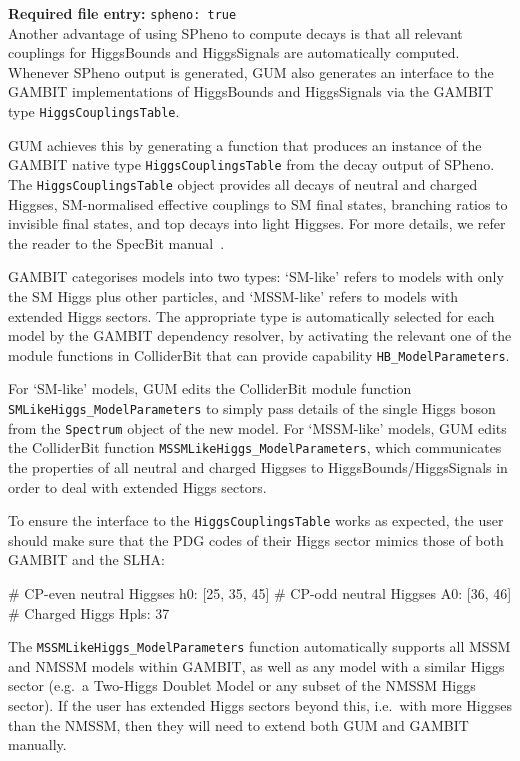 \documentclass[pdftex,twocolumn,epjc3_preprint,runningheads]{svjour3}
\renewcommand{\_}{\discretionary{\underscore}{}{\underscore}}
\newcommand\cpp[1]{{\lstinline!#1!}}  %
\newcommand\term[1]{{\lstset{style=terminal}\lstinline!#1!\lstset{style=cpp}}}
\newcommand\guminline[1]{{{\lstset{style=gum}\lstinline!#1!}}}
\newcommand{\eg}{e.g.\ }
\newcommand{\gambit}{\textsf{GAMBIT}\xspace}
\newcommand{\colliderbit}{\textsf{ColliderBit}\xspace}
\newcommand{\specbit}{\textsf{SpecBit}\xspace}
\newcommand{\GB}{\gambit}
\newcommand{\higgsbounds}{\textsf{HiggsBounds}\xspace}
\newcommand{\higgssignals}{\textsf{HiggsSignals}\xspace}
\newcommand{\gum}{\textsf{GUM}\xspace}
\newcommand{\dgum}{\!\!\term{.gum}\!\xspace}
\newcommand{\spheno}{\textsf{SPheno}\xspace}
\begin{document}
\textbf{Required \dgum file entry:} \guminline{spheno: true}\\

Another advantage of using \spheno to compute decays is that all relevant couplings for \higgsbounds and \higgssignals are automatically computed. Whenever \spheno output is generated, \gum also generates an interface to the \GB implementations of \higgsbounds and \higgssignals via the \GB type \cpp{HiggsCouplingsTable}.

\gum achieves this by generating a function that produces an instance of the \GB native type \cpp{HiggsCouplingsTable} from the decay output of \spheno. The \cpp{HiggsCouplingsTable} object provides all decays of neutral and charged Higgses, SM-normalised effective couplings to SM final states, branching ratios to invisible final states, and top decays into light Higgses. For more details, we refer the reader to the \specbit manual~\cite{SDPBit}.

\GB categorises models into two types: `SM-like' refers to models with only the SM Higgs plus other particles, and `MSSM-like' refers to models with extended Higgs sectors. The appropriate type is automatically selected for each model by the \GB dependency resolver, by activating the relevant one of the module functions in \colliderbit that can provide capability \cpp{HB_ModelParameters}.

For `SM-like' models, \gum edits the \colliderbit module function \cpp{SMLikeHiggs_ModelParameters} to simply pass details of the single Higgs boson from the \cpp{Spectrum} object of the new model. For `MSSM-like' models, \gum edits the \colliderbit function \cpp{MSSMLikeHiggs_ModelParameters}, which communicates the properties of all neutral and charged Higgses to \higgsbounds/\higgssignals in order to deal with extended Higgs sectors.

To ensure the interface to the \cpp{HiggsCouplingsTable} works as expected, the user should make sure that the PDG codes of their Higgs sector mimics those of both \GB and the SLHA:
%
\begin{lstgum}
# CP-even neutral Higgses
h0: [25, 35, 45]
# CP-odd neutral Higgses
A0: [36, 46]
# Charged Higgs
Hpls: 37
\end{lstgum}
%

The \cpp{MSSMLikeHiggs_ModelParameters} function automatically supports all MSSM and NMSSM models within \GB, as well as any model with a similar Higgs sector (\eg a Two-Higgs Doublet Model or any subset of the NMSSM Higgs sector). If the user has extended Higgs sectors beyond this, i.e.\ with more Higgses than the NMSSM, then they will need to extend both \gum and \GB manually.
\end{document}
